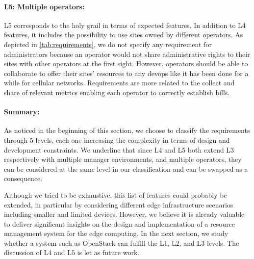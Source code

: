 \paragraph{L5: Multiple operators:}
L5 corresponds to the holy grail in terms of expected features.  In
addition to L4 features, it includes the possibility to use sites
owned by different operators. As depicted in \cref{tab:requirements},
we do not specify any requirement for administrators because an
operator would not share administrative rights to their sites with
other operators at the first sight. However, operators should be able
to collaborate to offer their sites' resources to any devops like it has
been done for a while for cellular networks. Requirements are more related to the collect and share
of relevant metrics enabling each operator to correctly establish bills.

\paragraph{Summary:}
As noticed in the beginning of this section, we choose to classify the
requirements through 5 levels, each one increasing the complexity in
terms of design and development constraints.  We underline that since
L4 and L5 both extend L3 respectively with multiple manager
environments, and multiple operators, they can be considered at the
same level in our classification and can be swapped as a consequence.

Although we tried to be exhaustive, this list of features could
probably be extended, in particular by considering different edge
infrastructure scenarios including smaller and limited devices.
However, we believe it is already valuable to deliver significant
insights on the design and implementation of a resource management
system for the edge computing. In the next section, we study whether a
system such as OpenStack can fulfill the L1, L2, and L3 levels.
The discussion of L4 and L5 is let as future work. 


